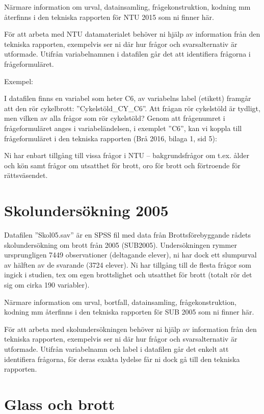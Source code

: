 \documentclass[
]{book}
\begin{document}
Närmare information om urval, datainsamling, frågekonstruktion, kodning mm återfinns i den
tekniska rapporten för NTU 2015 som ni finner här.

För att arbeta med NTU datamaterialet behöver ni hjälp av information från den tekniska
rapporten, exempelvis ser ni där hur frågor och svarsalternativ är utformade.
Utifrån variabelnamnen i datafilen går det att identifiera frågorna i frågeformuläret.

Exempel:

I datafilen finns en variabel som heter C6, av variabelns label (etikett) framgår att den rör
cykelbrott: ''Cykelstöld\_CY\_C6''. Att frågan rör cykelstöld är tydligt, men vilken av alla frågor
som rör cykelstöld? Genom att frågenumret i frågeformuläret anges i variabeländelsen, i
exemplet ''C6'', kan vi koppla till frågeformuläret i den tekniska rapporten (Brå 2016, bilaga 1,
sid 5):

Ni har enbart tillgång till vissa frågor i NTU -- bakgrundsfrågor om t.ex. ålder och kön samt
frågor om utsatthet för brott, oro för brott och förtroende för rättsväsendet.

\hypertarget{skolundersuxf6kning-2005}{%
\section{Skolundersökning 2005}\label{skolundersuxf6kning-2005}}

Datafilen ''Skol05.sav'' är en SPSS fil med data från Brottsförebyggande rådets
skolundersökning om brott från 2005 (SUB2005). Undersökningen rymmer ursprungligen 7449
observationer (deltagande elever), ni har dock ett slumpurval av hälften av de svarande (3724
elever). Ni har tillgång till de flesta frågor som ingick i studien, tex om egen brottslighet och
utsatthet för brott (totalt rör det sig om cirka 190 variabler).

Närmare information om urval, bortfall, datainsamling, frågekonstruktion, kodning mm återfinns
i den tekniska rapporten för SUB 2005 som ni finner här.

För att arbeta med skolundersökningen behöver ni hjälp av information från den tekniska
rapporten, exempelvis ser ni där hur frågor och svarsalternativ är utformade. Utifrån variabelnamn och label i datafilen går det enkelt att identifiera frågorna, för deras exakta
lydelse får ni dock gå till den tekniska rapporten.

\hypertarget{glass-och-brott}{%
\section{Glass och brott}\label{glass-och-brott}}
\end{document}
